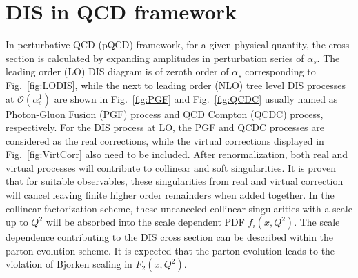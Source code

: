 \section{DIS in QCD framework}\label{sec:DISinQCD}
In perturbative QCD (pQCD) framework, for a given physical quantity, the cross
section is calculated by expanding amplitudes in perturbation series of
$\alpha_{s}$. The leading order (LO) DIS diagram is of zeroth order of
$\alpha_{s}$ corresponding to Fig.~\ref{fig:LODIS}, while the next to leading
order (NLO) tree level DIS processes at $\mathcal{O}(\alpha_{s}^{1})$ are shown
in Fig.~\ref{fig:PGF} and Fig.~\ref{fig:QCDC} usually named as Photon-Gluon
Fusion (PGF) process and QCD Compton (QCDC) process, respectively. For the DIS
process at LO, the PGF and QCDC processes are considered as the real
corrections, while the virtual corrections displayed in Fig.~\ref{fig:VirtCorr}
also need to be included. After renormalization, both real and virtual processes
will contribute to collinear and soft singularities. It is
proven~\cite{Kinoshita:1962ur,Lee:1964is} that for suitable observables, these
singularities from real and virtual correction will cancel leaving finite higher
order remainders when added together. In the collinear factorization scheme,
these uncanceled collinear singularities with a scale up to $Q^{2}$ will be
absorbed into the scale dependent PDF $f_{i}(x,Q^{2})$. The scale dependence
contributing to the DIS cross section can be described within the parton
evolution scheme. It is expected that the parton evolution leads to the
violation of Bjorken scaling in $F_{2}(x,Q^{2})$.

